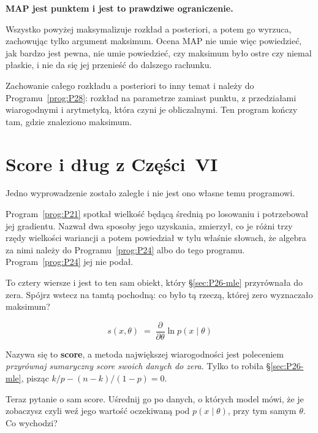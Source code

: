\begin{fr}
\begin{warning}
\textbf{MAP jest punktem i jest to prawdziwe ograniczenie.}

Wszystko powyżej maksymalizuje rozkład a posteriori, a potem go wyrzuca,
zachowując tylko argument maksimum. Ocena MAP nie umie więc powiedzieć, jak
bardzo jest pewna, nie umie powiedzieć, czy maksimum było ostre czy niemal
płaskie, i nie da się jej przenieść do dalszego rachunku.

Zachowanie całego rozkładu a posteriori to inny temat i należy do
Programu~\ref{prog:P28}: rozkład na parametrze zamiast punktu, z przedziałami
wiarogodnymi i arytmetyką, która czyni je obliczalnymi. Ten program kończy
tam, gdzie znaleziono maksimum.
\end{warning}

\end{fr}

\section{Score i dług z Części~VI}
\label{sec:P26-score}

\begin{fr}
Jedno wyprowadzenie zostało zaległe i nie jest ono własne temu programowi.

Program~\ref{prog:P21} spotkał wielkość będącą średnią po losowaniu i
potrzebował jej gradientu. Nazwał dwa sposoby jego uzyskania, zmierzył, co je
różni \dash{} trzy rzędy wielkości wariancji \dash{} a potem powiedział w
tylu właśnie słowach, że algebra za nimi należy do Programu~\ref{prog:P24}
albo do tego programu. Program~\ref{prog:P24} jej nie podał.

To cztery wiersze i jest to ten sam obiekt, który \S\ref{sec:P26-mle}
przyrównała do zera. Spójrz wstecz na tamtą pochodną: co było tą rzeczą,
której zero wyznaczało maksimum?
\dotline
\nextframe
\end{fr}

\begin{fr}

\[ s(x, \theta) \;=\; \frac{\partial}{\partial \theta}
   \ln p(x \mid \theta) \]

Nazywa się to \textbf{score}, a metoda największej wiarogodności jest
poleceniem \emph{przyrównaj sumaryczny score swoich danych do zera}. Tylko to
robiła \S\ref{sec:P26-mle}, pisząc $k/p - (n-k)/(1-p) = 0$.

Teraz pytanie o sam score. Uśrednij go po danych, o których model mówi, że je
zobaczysz \dash{} czyli weź jego wartość oczekiwaną pod
$p(x \mid \theta)$, przy tym samym $\theta$. Co wychodzi?
\dotline
\nextframe
\end{fr}


